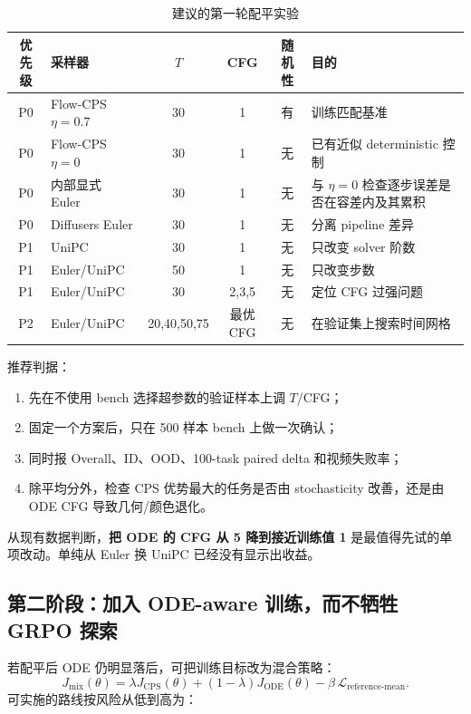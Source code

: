 \documentclass[11pt,a4paper]{article}
\begin{document}
\begin{table}[htbp]
  \centering
  \caption{建议的第一轮配平实验}
  \label{tab:matched-grid}
  \small
  \begin{tabularx}{\textwidth}{clcccX}
    \toprule
    优先级 & 采样器 & $T$ & CFG & 随机性 & 目的\\
    \midrule
    P0 & Flow-CPS $\eta=0.7$ & 30 & 1 & 有
       & 训练匹配基准\\
    P0 & Flow-CPS $\eta=0$ & 30 & 1 & 无
       & 已有近似 deterministic 控制\\
    P0 & 内部显式 Euler & 30 & 1 & 无
       & 与 $\eta=0$ 检查逐步误差是否在容差内及其累积\\
    P0 & Diffusers Euler & 30 & 1 & 无
       & 分离 pipeline 差异\\
    P1 & UniPC & 30 & 1 & 无
       & 只改变 solver 阶数\\
    P1 & Euler/UniPC & 50 & 1 & 无
       & 只改变步数\\
    P1 & Euler/UniPC & 30 & 2,3,5 & 无
       & 定位 CFG 过强问题\\
    P2 & Euler/UniPC & 20,40,50,75 & 最优 CFG & 无
       & 在验证集上搜索时间网格\\
    \bottomrule
  \end{tabularx}
\end{table}

推荐判据：

\begin{enumerate}
  \item 先在不使用 bench 选择超参数的验证样本上调 $T$/CFG；
  \item 固定一个方案后，只在 500 样本 bench 上做一次确认；
  \item 同时报 Overall、ID、OOD、100-task paired delta 和视频失败率；
  \item 除平均分外，检查 CPS 优势最大的任务是否由 stochasticity
  改善，还是由 ODE CFG 导致几何/颜色退化。
\end{enumerate}

从现有数据判断，\textbf{把 ODE 的 CFG 从 5 降到接近训练值 1}
是最值得先试的单项改动。单纯从 Euler 换 UniPC 已经没有显示出收益。

\subsection{第二阶段：加入 ODE-aware 训练，而不牺牲 GRPO 探索}

若配平后 ODE 仍明显落后，可把训练目标改为混合策略：
\begin{equation}
  J_{\mathrm{mix}}(\theta)
  =\lambda J_{\mathrm{CPS}}(\theta)
   +(1-\lambda)J_{\mathrm{ODE}}(\theta)
   -\beta\,\mathcal{L}_{\mathrm{reference\text{-}mean}}.
  \label{eq:mixed-objective}
\end{equation}
可实施的路线按风险从低到高为：
\end{document}
